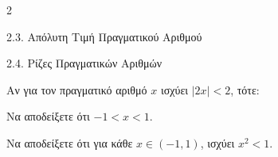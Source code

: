 \begin{ylh}{2}
    \item 2.3. Απόλυτη Τιμή Πραγματικού Αριθμού
    \item 2.4. Ρίζες Πραγματικών Αριθμών
\end{ylh}
Αν για τον πραγματικό αριθμό $x$ ισχύει $|2x| < 2$, τότε:
\begin{alist}
\item Να αποδείξετε ότι $-1 < x < 1$. 
\item Να αποδείξετε ότι για κάθε $x \in (-1, 1)$, ισχύει $x^2 < 1$. 
\end{alist}

